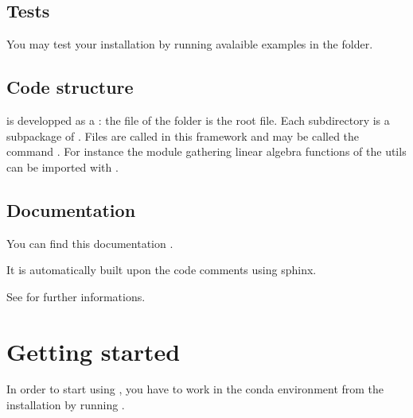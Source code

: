 \documentclass[letterpaper,10pt,english]{sphinxmanual}
\begin{document}
\subsection{Tests}
\label{\detokenize{install:tests}}
\sphinxAtStartPar
You may test your installation by running avalaible examples in the  folder.


\subsection{Code structure}
\label{\detokenize{install:code-structure}}
\sphinxAtStartPar
{} is developped as a : the  file of the  folder is the root file. Each subdirectory is a sub\sphinxhyphen{}package of . Files are called  in this framework and may be called  the command . For instance the module  gathering linear algebra functions of the  utils can be imported with .


\subsection{Documentation}
\label{\detokenize{install:documentation}}
\sphinxAtStartPar
You can find this documentation .

\sphinxAtStartPar
It is automatically built upon the code comments using sphinx.

\sphinxAtStartPar
See  for further informations.

\sphinxstepscope


\section{Getting started}
\label{\detokenize{started:getting-started}}\label{\detokenize{started::doc}}\label{\detokenize{started:started}}
\sphinxAtStartPar
In order to start using , you have to work in the conda environment  from the installation by running .
\end{document}

